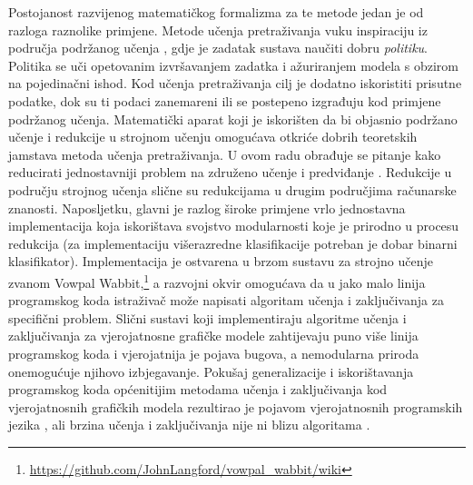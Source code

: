 Postojanost razvijenog matematičkog formalizma za te metode jedan je od razloga
raznolike primjene. Metode učenja pretraživanja vuku inspiraciju iz područja
podržanog učenja  \citep{sutton1998reinforcement},
gdje je zadatak sustava naučiti dobru \emph{politiku}. Politika se uči
opetovanim izvršavanjem zadatka i ažuriranjem modela s obzirom na pojedinačni
ishod. Kod učenja pretraživanja cilj je dodatno iskoristiti prisutne podatke,
dok su ti podaci zanemareni ili se postepeno izgrađuju kod primjene podržanog
učenja. Matematički aparat koji je iskorišten da bi objasnio podržano učenje i
redukcije u strojnom učenju  omogućava otkriće
dobrih teoretskih jamstava metoda učenja pretraživanja. U ovom radu obrađuje se
pitanje kako reducirati jednostavniji problem na združeno učenje i predviđanje
. Redukcije u području strojnog učenja
slične su redukcijama u drugim područjima računarske znanosti. Naposljetku,
glavni je razlog široke primjene vrlo jednostavna implementacija koja
iskorištava svojstvo modularnosti koje je prirodno u procesu redukcija (za
implementaciju višerazredne klasifikacije potreban je dobar binarni
klasifikator). Implementacija je ostvarena u brzom sustavu za strojno učenje
zvanom Vowpal
Wabbit,\footnote{\url{https://github.com/JohnLangford/vowpal_wabbit/wiki}} a
razvojni okvir \lts{} omogućava da u jako malo linija programskog koda
istraživač može napisati algoritam učenja i zaključivanja za specifični problem.
Slični sustavi koji implementiraju algoritme učenja i zaključivanja za
vjerojatnosne grafičke modele zahtijevaju puno više linija programskog koda i
vjerojatnija je pojava bugova, a nemodularna priroda onemogućuje njihovo
izbjegavanje. Pokušaj generalizacije i iskorištavanja programskog koda
općenitijim metodama učenja i zaključivanja kod vjerojatnosnih grafičkih modela
rezultirao je pojavom vjerojatnosnih programskih jezika , ali brzina učenja i zaključivanja nije ni blizu
algoritama \lts{}.

